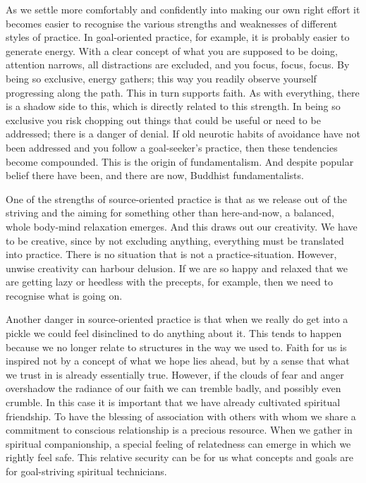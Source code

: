 As we settle more comfortably and confidently into making our own right
effort it becomes easier to recognise the various strengths and
weaknesses of different styles of practice. In goal-oriented practice,
for example, it is probably easier to generate energy. With a clear
concept of what you are supposed to be doing, attention narrows, all
distractions are excluded, and you focus, focus, focus. By being so
exclusive, energy gathers; this way you readily observe yourself
progressing along the path. This in turn supports faith. As with
everything, there is a shadow side to this, which is directly related to
this strength. In being so exclusive you risk chopping out things that
could be useful or need to be addressed; there is a danger of denial. If
old neurotic habits of avoidance have not been addressed and you follow
a goal-seeker's practice, then these tendencies become compounded. This
is the origin of fundamentalism. And despite popular belief there have
been, and there are now, Buddhist fundamentalists.

One of the strengths of source-oriented practice is that as we release
out of the striving and the aiming for something other than
here-and-now, a balanced, whole body-mind relaxation emerges. And this
draws out our creativity. We have to be creative, since by not excluding
anything, everything must be translated into practice. There is no
situation that is not a practice-situation. However, unwise creativity
can harbour delusion. If we are so happy and relaxed that we are getting
lazy or heedless with the precepts, for example, then we need to
recognise what is going on.

Another danger in source-oriented practice is that when we really do get
into a pickle we could feel disinclined to do anything about it. This
tends to happen because we no longer relate to structures in the way we
used to. Faith for us is inspired not by a concept of what we hope lies
ahead, but by a sense that what we trust in is already essentially true.
However, if the clouds of fear and anger overshadow the radiance of our
faith we can tremble badly, and possibly even crumble. In this case it
is important that we have already cultivated spiritual friendship. To
have the blessing of association with others with whom we share a
commitment to conscious relationship is a precious resource. When we
gather in spiritual companionship, a special feeling of relatedness can
emerge in which we rightly feel safe. This relative security can be for
us what concepts and goals are for goal-striving spiritual technicians.

